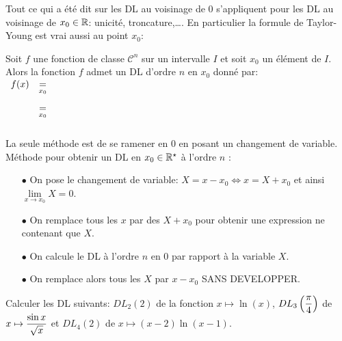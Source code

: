 \documentclass[a4paper, 11pt]{article}
\begin{document}
{{}\vsec

 \noindent Tout ce qui a \'et\'e dit sur les DL au voisinage de 0 s'appliquent pour les DL au voisinage de $x_0\in\mathbb{R}$: unicit\'e, troncature,\ldots. En particulier la formule de Taylor-Young est vrai aussi au point $x_0$:\\

 {\noindent  

\begin{theorem}
Soit $f$ une fonction de classe $\mathcal{C}^n$ sur un intervalle $I$ et soit $x_0$ un \'el\'ement de $I$.\\
Alors la fonction $f$ admet un DL d'ordre $n$ en $x_0$ donn\'e par:\vsec\\
\noindent $\begin{array}{rcl}
f(x) & \underset{x_0}{=} & \dotfill\vsec\\
& \underset{x_0}{=} & \vsec
\end{array}$
\end{theorem}
 
}\vsec

\vspace*{0.4cm}

\begin{dboxminipage}{0.9 \textwidth}
\noindent La seule m\'ethode est de se ramener en 0 en posant un changement de variable.\\
\noindent M\'ethode pour obtenir un DL en $x_0\in\mathbb{R}^{\star}$ \`a l'ordre $n$ :\\


 
\begin{itemize}
\item[$\bullet$] On pose le changement de variable: $X=x-x_0\Leftrightarrow x=X+x_0$ et ainsi $\lim\limits_{x\to x_0} X=0$.
\item[$\bullet$] On remplace tous les $x$ par des $X+x_0$ pour obtenir une expression ne contenant que $X$.
\item[$\bullet$] On calcule le DL \`a l'ordre $n$ en 0 par rapport \`a la variable $X$.
\item[$\bullet$] On remplace alors tous les $X$ par $x-x_0$ SANS DEVELOPPER.
\end{itemize}
\end{dboxminipage}


 



{\footnotesize \begin{exercice} Calculer les DL suivants: $DL_2(2)$ de la fonction $x\mapsto \ln{(x)}$, $DL_3\left( \displaystyle\frac{\pi}{4} \right)$ de $x\mapsto \displaystyle\frac{\sin{x}}{\sqrt{x}}$ et $DL_4(2)$ de $x\mapsto (x-2)\ln{(x-1)}$.
\end{exercice}
}


}
\end{document}

